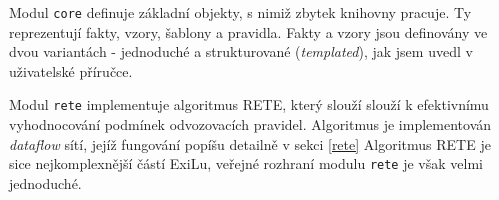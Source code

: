 Modul \verb|core| definuje základní objekty, s nimiž zbytek knihovny
pracuje.  Ty reprezentují fakty, vzory, šablony a pravidla. Fakty a vzory jsou
definovány ve dvou variantách - jednoduché a strukturované (\emph{templated}),
jak jsem uvedl v uživatelské příručce.






Modul \verb|rete| implementuje algoritmus RETE, který slouží slouží k
efektivnímu vyhodnocování podmínek odvozovacích pravidel. Algoritmus je
implementován \emph{dataflow} sítí, jejíž fungování popíšu detailně v sekci
\ref{rete} Algoritmus RETE je sice nejkomplexnější částí ExiLu, veřejné rozhraní
modulu \verb|rete| je však velmi jednoduché.


